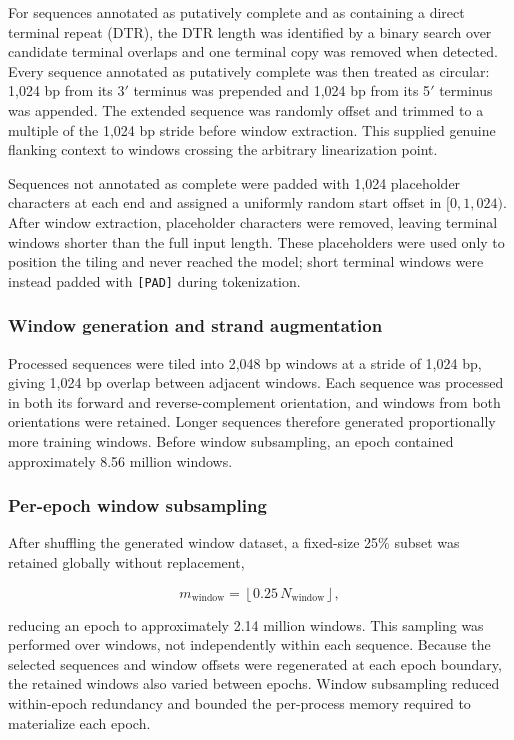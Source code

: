 For sequences annotated as putatively complete and as containing a direct
terminal repeat (DTR), the DTR length was identified by a binary search over
candidate terminal overlaps and one terminal copy was removed when detected.
Every sequence annotated as putatively complete was then treated as circular:
1,024 bp from its 3$'$ terminus was prepended and 1,024 bp from its 5$'$
terminus was appended. The extended sequence was randomly offset and trimmed
to a multiple of the 1,024 bp stride before window extraction. This supplied
genuine flanking context to windows crossing the arbitrary linearization
point.

Sequences not annotated as complete were padded with 1,024 placeholder
characters at each end and assigned a uniformly random start offset in
\([0,1{,}024)\). After window extraction, placeholder characters were removed,
leaving terminal windows shorter than the full input length. These
placeholders were used only to position the tiling and never reached the
model; short terminal windows were instead padded with \texttt{[PAD]} during
tokenization.

\subsubsection*{Window generation and strand augmentation}

Processed sequences were tiled into 2,048 bp windows at a stride of 1,024 bp,
giving 1,024 bp overlap between adjacent windows. Each sequence was processed
in both its forward and reverse-complement orientation, and windows from both
orientations were retained. Longer sequences therefore generated
proportionally more training windows. Before window subsampling, an epoch
contained approximately 8.56 million windows.

\subsubsection*{Per-epoch window subsampling}

After shuffling the generated window dataset, a fixed-size 25\% subset was
retained globally without replacement,

\[
m_{\mathrm{window}}=\left\lfloor 0.25\,N_{\mathrm{window}}\right\rfloor,
\]

reducing an epoch to approximately 2.14 million windows. This sampling was
performed over windows, not independently within each sequence. Because the
selected sequences and window offsets were regenerated at each epoch
boundary, the retained windows also varied between epochs. Window subsampling
reduced within-epoch redundancy and bounded the per-process memory required to
materialize each epoch.

